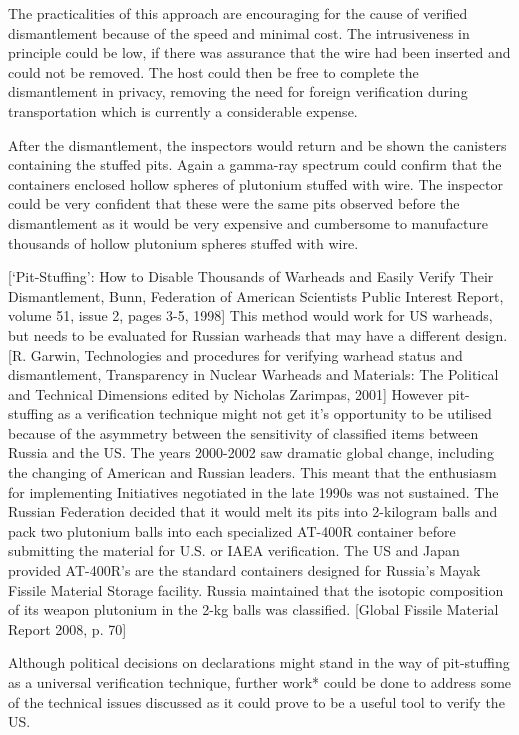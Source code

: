 \documentclass[twoside,titlepage,11pt,twocolumn,a4paper]{article}
\begin{document}
The practicalities of this approach are encouraging for the cause of
verified dismantlement because of the speed and minimal cost. The
intrusiveness in principle could be low, if there was assurance that
the wire had been inserted and could not be removed. The host could
then be free to complete the dismantlement in privacy, removing the
need for foreign verification during transportation which is currently
a considerable expense.

After the dismantlement, the inspectors would return and be shown the
canisters containing the stuffed pits. Again a gamma-ray spectrum
could confirm that the containers enclosed hollow spheres of plutonium
stuffed with wire. The inspector could be very confident that these
were the same pits observed before the dismantlement as it would be
very expensive and cumbersome to manufacture thousands of hollow
plutonium spheres stuffed with wire.

[`Pit-Stuffing': How to Disable Thousands of Warheads and Easily
  Verify Their Dismantlement, Bunn, Federation of American Scientists
  Public Interest Report, volume 51, issue 2, pages 3-5, 1998] This
method would work for US warheads, but needs to be evaluated for
Russian warheads that may have a different design.  [R. Garwin,
  Technologies and procedures for verifying warhead status and
  dismantlement, Transparency in Nuclear Warheads and Materials: The
  Political and Technical Dimensions edited by Nicholas Zarimpas,
  2001] However pit-stuffing as a verification technique might not get
it’s opportunity to be utilised because of the asymmetry between the
sensitivity of classified items between Russia and the US. The years
2000-2002 saw dramatic global change, including the changing of
American and Russian leaders. This meant that the enthusiasm for
implementing Initiatives negotiated in the late 1990s was not
sustained. The Russian Federation decided that it would melt its pits
into 2-kilogram balls and pack two plutonium balls into each
specialized AT-400R container before submitting the material for
U.S. or IAEA verification. The US and Japan provided AT-400R's are the
standard containers designed for Russia's Mayak Fissile Material
Storage facility. Russia maintained that the isotopic composition of
its weapon plutonium in the 2-kg balls was classified.  [Global
  Fissile Material Report 2008, p. 70]

Although political decisions on declarations might stand in the way of
pit-stuffing as a universal verification technique, further work*
could be done to address some of the technical issues discussed as it
could prove to be a useful tool to verify the US.
\end{document}
